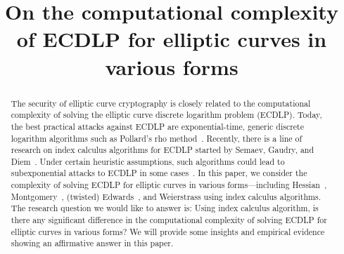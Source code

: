 \documentclass{llncs}
\begin{document}
%
\title{On the computational complexity of ECDLP for elliptic curves in
  various forms}
%
%
%
%

\maketitle              %

\begin{abstract}
%
  The security of elliptic curve cryptography is closely related to
  the computational complexity of solving the elliptic curve discrete
  logarithm problem (ECDLP).
%
  Today, the best practical attacks against ECDLP are
  exponential-time, generic discrete logarithm algorithms such as
  Pollard's rho method~\cite{1978-pollard-kangaroo}.
%
  Recently, there is a line of research on index calculus algorithms
  for ECDLP started by Semaev, Gaudry, and
  Diem~\cite{DBLP:journals/iacr/Semaev04,DBLP:journals/jsc/Gaudry09,DBLP:journals/moc/Diem11}.
%
  Under certain heuristic assumptions, such algorithms could lead to
  subexponential attacks to ECDLP in some
  cases~\cite{DBLP:conf/eurocrypt/FaugerePPR12,DBLP:journals/iacr/PetitQ12,DBLP:conf/iwsec/HuangPST13}.
%
  In this paper, we consider the complexity of solving ECDLP for
  elliptic curves in various forms---including
  Hessian~\cite{DBLP:conf/ches/Smart01},
  Montgomery~\cite{1987-montgomery}, (twisted)
  Edwards~\cite{DBLP:journals/iacr/BernsteinL07,DBLP:journals/iacr/BernsteinBJLP08},
  and Weierstrass using index calculus algorithms.
%
  The research question we would like to answer is: Using index
  calculus algorithm, is there any significant difference in the
  computational complexity of solving ECDLP for elliptic curves in
  various forms?
%
  We will provide some insights and empirical evidence showing an
  affirmative answer in this paper.
%
\end{abstract}









%
%


\end{document}

